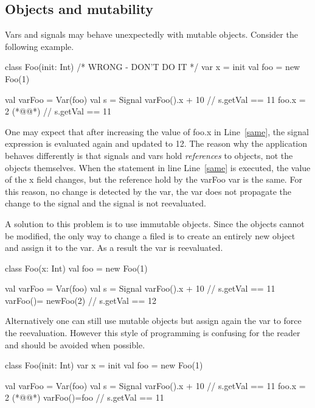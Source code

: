 \documentclass[10pt,a4paper]{article}
\newcommand{\code}[1]{{\fontfamily{cmtt}\small\selectfont#1}}
\begin{document}
\subsection{Objects and mutability} Vars and signals may behave
unexpectedly with mutable objects. Consider the following example.

\begin{codenv}
class Foo(init: Int){            /* WRONG - DON'T DO IT */
  var x = init
}
val foo = new Foo(1)

val varFoo = Var(foo)           
val s = Signal{ varFoo().x + 10 }
// s.getVal == 11
foo.x = 2 (*@\label{same}@*)
// s.getVal == 11 
\end{codenv}

One may expect that after increasing the value of \code{foo.x} in
Line~\ref{same}, the signal expression is evaluated again and updated
to 12. The reason why the application behaves differently is that
signals and vars hold {\it references} to objects, not the objects
themselves. When the statement in line Line~\ref{same} is executed,
the value of the \code{x} field changes, but the reference hold by the
\code{varFoo} var is the same. For this reason, no change is detected
by the var, the var does not propagate the change to the signal and
the signal is not reevaluated.

A solution to this problem is to use immutable objects. Since the
objects cannot be modified, the only way to change a filed is to
create an entirely new object and assign it to the var. As a result
the var is reevaluated.

\begin{codenv}
class Foo(x: Int){}
val foo = new Foo(1)

val varFoo = Var(foo)           
val s = Signal{ varFoo().x + 10 }
// s.getVal == 11
varFoo()= newFoo(2)
// s.getVal == 12 
\end{codenv}

Alternatively one can still use mutable objects but assign again the
var to force the reevaluation. However this style of programming is
confusing for the reader and should be avoided when possible.

\begin{codenv}
class Foo(init: Int){
  var x = init
}
val foo = new Foo(1)

val varFoo = Var(foo)           
val s = Signal{ varFoo().x + 10 }
// s.getVal == 11
foo.x = 2 (*@\label{same}@*)
varFoo()=foo
// s.getVal == 11 
\end{codenv}
\end{document}
